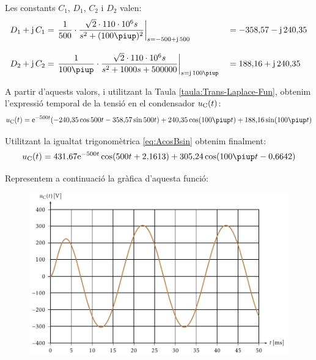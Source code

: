 \begin{exemple}
Les constants $C_1$, $D_1$,  $C_2$ i $D_2$ valen:
\begin{alignat*}{2}
    D_1 + \ju\,C_1 &= \left.\frac{1}{500}\cdot \frac{\sqrt{2}\cdot 110\cdot 10^6 s}
    {s^2 +(100\piup)^2}\right|_{s=-500+\ju\,500} &&=-358{,}57 -\ju\,
    240{,}35\\[2ex]
    D_2 + \ju\,C_2 &= \left.\frac{1}{100\piup}\cdot\frac{\sqrt{2}\cdot 110\cdot 10^6 s}
    {s^2 + 1000 s + 500000}\right|_{s=\ju\,100\piup} &&= 188{,}16 + \ju\,240{,}35
\end{alignat*}

A partir d'aquests valors, i utilitzant la Taula
\vref{taula:Trans-Laplace-Fun}, obtenim l'expressi\'{o} temporal de la
tensi\'{o} en el condensador $u_\mathrm{C}(t)$:
\[
    u\ped{C}(t) = \eu^{-500t} (-240{,}35 \cos 500 t - 358{,}57 \sin 500
    t) + 240{,}35 \cos (100\piup t) + 188{,}16 \sin( 100\piup
    t)
\]

Utilitzant la igualtat trigonom\`{e}trica \eqref{eq:AcosBsin} obtenim finalment:
\[
    u\ped{C}(t)= 431{,}67 \eu^{-500t} \cos(500 t +2{,}1613) + 305{,}24 \cos (100\piup t - 0{,}6642)
\]

\break
Representem a continuaci\'{o} la gr\`{a}fica d'aquesta
funci\'{o}:

\begin{figure}[h]
\centering
  \includegraphics{Imatges/Cap-Laplace-Exemple4-Tensio.pdf}
\end{figure}

\end{exemple}
